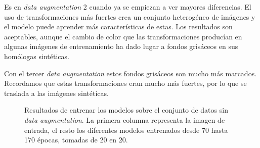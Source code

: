 Es en \textit{data augmentation} 2 cuando ya se empiezan a ver mayores diferencias. El uso de transformaciones más fuertes crea un conjunto heterogéneo de imágenes y el modelo puede aprender más características de estas. Los resultados son aceptables, aunque el cambio de color que las transformaciones producían en algunas imágenes de entrenamiento ha dado lugar a fondos grisáceos en sus homólogas sintéticas. 

Con el tercer \textit{data augmentation} estos fondos grisáceos son mucho más marcados. Recordamos que estas transformaciones eran mucho más fuertes, por lo que se traslada a las imágenes sintéticas.


\begin{figure}[H]
\centering
    \caption{Resultados de entrenar los modelos sobre el conjunto de datos sin \textit{data augmentation}. La primera columna representa la imagen de entrada, el resto los diferentes modelos entrenados desde 70 hasta 170 épocas, tomadas de 20 en 20.} 
\end{figure}

